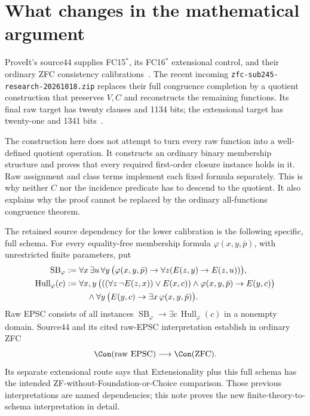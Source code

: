 \section{What changes in the mathematical argument}

ProveIt's source44 supplies FC15$^*$, its FC16$^*$ extensional control,
and their ordinary ZFC consistency calibrations~\cite{source44}. The recent incoming
\texttt{zfc-sub245-research-20261018.zip} replaces their full congruence
completion by a quotient construction that preserves $V,C$ and
reconstructs the remaining functions. Its final raw target has twenty
clauses and 1134 bits; the extensional target has twenty-one and 1341 bits~\cite{incoming20261018}.

The construction here does not attempt to turn every raw function into a
well-defined quotient operation. It constructs an ordinary binary
membership structure and proves that every required first-order closure
instance holds in it. Raw assignment and class terms implement each fixed
formula separately. This is why neither $C$ nor the incidence predicate
has to descend to the quotient. It also explains why the proof cannot be
replaced by the ordinary all-functions congruence theorem.

The retained source dependency for the lower calibration is the following
specific, full schema. For every equality-free membership formula
$\varphi(x,y,\bar p)$, with unrestricted finite parameters, put
\begin{align*}
\operatorname{SB}_\varphi
 &:=\forall x\,\exists u\,\forall y\,
  \bigl(\varphi(x,y,\bar p)\to
         \forall z(E(z,y)\to E(z,u))\bigr),\\
\operatorname{Hull}_\varphi(c)
 &:=\forall x,y\,
  \bigl(((\forall z\,\neg E(z,x))\lor E(x,c))\land
          \varphi(x,y,\bar p)\to E(y,c)\bigr)\\
 &\hspace{9mm}\land\forall y\,
       \bigl(E(y,c)\to\exists x\,\varphi(x,y,\bar p)\bigr).
\end{align*}
Raw EPSC consists of all instances
$\operatorname{SB}_\varphi\to\exists c\,
\operatorname{Hull}_\varphi(c)$ in a nonempty domain.
Source44 and its cited raw-EPSC interpretation establish in ordinary ZFC
\[
\Con(\mathrm{raw\ EPSC})\longrightarrow\Con(\mathrm{ZFC}).
\]
Its separate extensional route says that Extensionality plus this full
schema has the intended ZF-without-Foundation-or-Choice comparison. Those
previous interpretations are named dependencies; this note proves the
new finite-theory-to-schema interpretation in detail.

